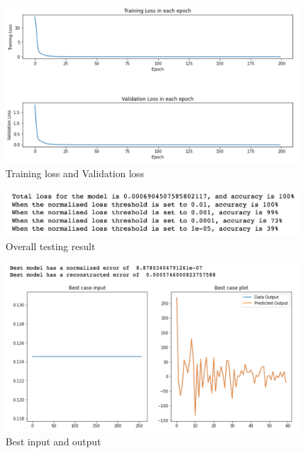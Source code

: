 \begin{figure}[H]
    \caption{Training loss and Validation loss}
    \includegraphics[scale=0.6]{figures/geoid_images/Geoid_trainingData.png}
\end{figure}

\begin{figure}[H]
    \caption{Overall testing result}
    \includegraphics[scale=0.8]{figures/geoid_images/Geoid_OverallTesting.png}
\end{figure}

\begin{figure}[H]
    \caption{Best input and output}
    \includegraphics[scale=0.6]{figures/geoid_images/Geoid_Best.png}
\end{figure}

